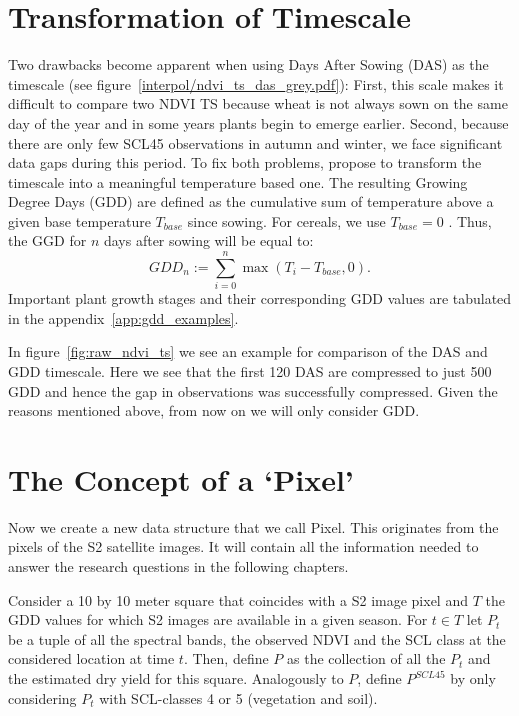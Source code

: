\section{Transformation of Timescale}\label{sec:gdd_def}
	{%
		Two drawbacks become apparent when using Days After Sowing (DAS) as the timescale (see figure~\ref{interpol/ndvi_ts_das_grey.pdf}): First, this scale makes it difficult to compare two NDVI {TS} because wheat is not always sown on the same day of the year and in some years plants begin to emerge earlier. Second, because there are only few SCL45 observations in autumn and winter, we face significant data gaps during this period. To fix both problems, \cite{mcmasterGrowingDegreedaysOne1997} propose to transform the timescale into a meaningful temperature based one. The resulting Growing Degree Days ({GDD}) are defined as the cumulative sum of temperature above a given base temperature $T_{base}$ since sowing. For cereals, we use $T_{base}=0$ \citep{holzkamperSpatialTemporalTrends2015}. Thus, the GGD for $n$ days after sowing will be equal to:
		\begin{equation}
			\label{eq:gdd}
			GDD_n := \sum_{i=0}^n \max(T_i - T_{base}, 0).
		\end{equation}
		Important plant growth stages and their corresponding GDD values are tabulated in the appendix~\ref{app:gdd_examples}.

		In figure~\ref{fig:raw_ndvi_ts} we see an example for comparison of the DAS and GDD timescale. Here we see that the first 120 DAS are compressed to just 500 GDD and hence the gap in observations was successfully compressed. Given the reasons mentioned above, from now on we will only consider GDD.
	} 

\section{The Concept of a `Pixel'}{ \label{sec:gather_data_to_pixel}
	Now we create a new data structure that we call Pixel. This originates from the pixels of the S2 satellite images. It will contain all the information needed to answer the research questions in the following chapters. 
		
		Consider a 10 by 10 meter square that coincides with a S2 image pixel and $T$ the GDD values for which S2 images are available in a given season. For $t\in T$ let $P_t$ be a tuple of all the spectral bands, the observed NDVI and the SCL class at the considered location at time $t$. Then, define $P$ as the collection of all the $P_t$ and the estimated dry yield for this square.
		Analogously to $P$, define $P^{SCL45}$ by only considering $P_t$ with SCL-classes 4 or 5 (vegetation and soil).  
}

